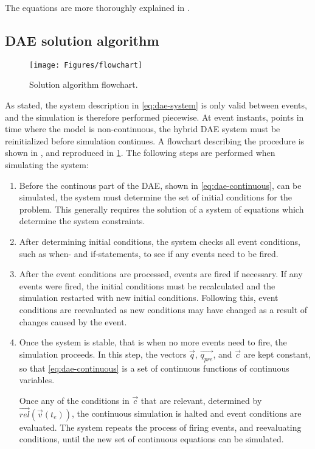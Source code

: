 \documentclass[\rootfolder/main.tex]{subfiles}
\begin{document}
The equations are more thoroughly explained in \cite{openmodelica.org:lundvall:sims:2005}.

\subsection{DAE solution algorithm}

\begin{figure}[H]
    \centering
    \texttt{[image: Figures/flowchart]}
    \caption{Solution algorithm flowchart.\label{fig:modelica-dae-flowchart}}
\end{figure}

As stated, the system description in \cref{eq:dae-system} is only valid between events, and the simulation is therefore performed piecewise.
At event instants, points in time where the model is non-continuous, the hybrid DAE system must be reinitialized before simulation continues.
A flowchart describing the procedure is shown in \cite{openmodelica.org:lundvall:sims:2005}, and reproduced in \cref{fig:modelica-dae-flowchart}.
The following steps are performed when simulating the system:

\begin{enumerate}
    \item Before the continous part of the DAE, shown in \cref{eq:dae-continuous}, can be simulated, the system must determine the set of initial conditions for the problem.
	This generally requires the solution of a system of equations which determine the system constraints.

    \item After determining initial conditions, the system checks all event conditions, such as when- and if-statements, to see if any events need to be fired.

    \item After the event conditions are processed, events are fired if necessary.
	If any events were fired, the initial conditions must be recalculated and the simulation restarted with new initial conditions.
	Following this, event conditions are reevaluated as new conditions may have changed as a result of changes caused by the event.

    \item Once the system is stable, that is when no more events need to fire, the simulation proceeds.
	In this step, the vectors $\vec{q}$, $\vec{q_{pre}}$, and $\vec{c}$ are kept constant, so that \cref{eq:dae-continuous} is a set of continuous functions of continuous variables.

	Once any of the conditions in $\vec{c}$ that are relevant, determined by $\vec{rel}(\vec{v}(t_{e}))$, the continuous simulation is halted and event conditions are evaluated.
	The system repeats the process of firing events, and reevaluating conditions, until the new set of continuous equations can be simulated.
\end{enumerate}
\end{document}
